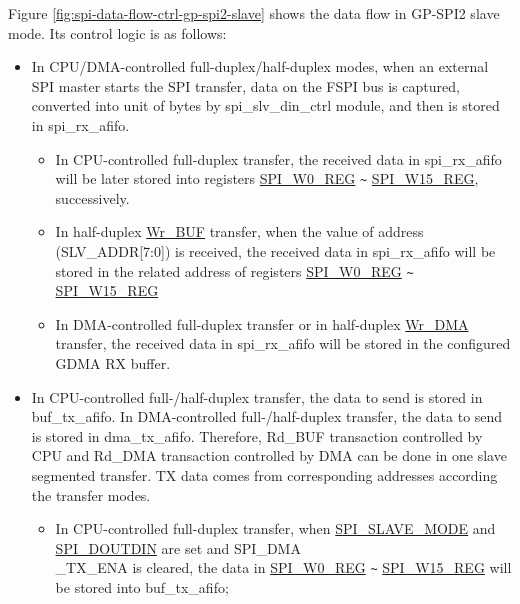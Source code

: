 \documentclass[main\_\_EN.tex]{subfiles}
\begin{document}
Figure \ref{fig:spi-data-flow-ctrl-gp-spi2-slave} shows the data flow in GP-SPI2 slave mode. Its control logic is as follows:
\begin{itemize}
    \item In CPU/DMA-controlled full-duplex/half-duplex modes, when an external SPI master starts the SPI transfer, data on the FSPI bus is captured, converted into unit of bytes by spi\_slv\_din\_ctrl module, and then is stored in spi\_rx\_afifo.
    \begin{itemize}
        \item In CPU-controlled full-duplex transfer, the received data in spi\_rx\_afifo will be later stored into registers \hyperref[regdesc:SPIW0REG]{SPI\_W0\_REG}  \verb+~+ \hyperref[regdesc:SPIW15REG]{SPI\_W15\_REG}, successively.

        \item In half-duplex \hyperref[other:spi-item-wrbuf]{Wr\_BUF} transfer, when the value of address (SLV\_ADDR[7:0]) is received, the received data in spi\_rx\_afifo will be stored in the related address of registers \hyperref[regdesc:SPIW0REG]{SPI\_W0\_REG}  \verb+~+ \hyperref[regdesc:SPIW15REG]{SPI\_W15\_REG}


        \item In DMA-controlled full-duplex transfer or in half-duplex \hyperref[other:spi-item-wrdma]{Wr\_DMA} transfer, the received data in spi\_rx\_afifo will be stored in the configured GDMA RX buffer.

    \end{itemize}

    \item In CPU-controlled full-/half-duplex transfer, the data to send is stored in buf\_tx\_afifo. In DMA-controlled full-/half-duplex transfer, the data to send is stored in dma\_tx\_afifo. Therefore, Rd\_BUF transaction controlled by CPU and Rd\_DMA transaction controlled by DMA can be done in one slave segmented transfer. TX data comes from corresponding addresses according the transfer modes.
    \begin{itemize}
        \item In CPU-controlled full-duplex transfer, when \hyperref[fielddesc:SPISLAVEMODE]{SPI\_SLAVE\_MODE} and \hyperref[fielddesc:SPIDOUTDIN]{SPI\_DOUTDIN} are set and SPI\_DMA\\\_TX\_ENA is cleared, the data in \hyperref[regdesc:SPIW0REG]{SPI\_W0\_REG} \verb+~+ \hyperref[regdesc:SPIW15REG]{SPI\_W15\_REG} will be stored into buf\_tx\_afifo;


\end{itemize}
\end{itemize}
\end{document}
